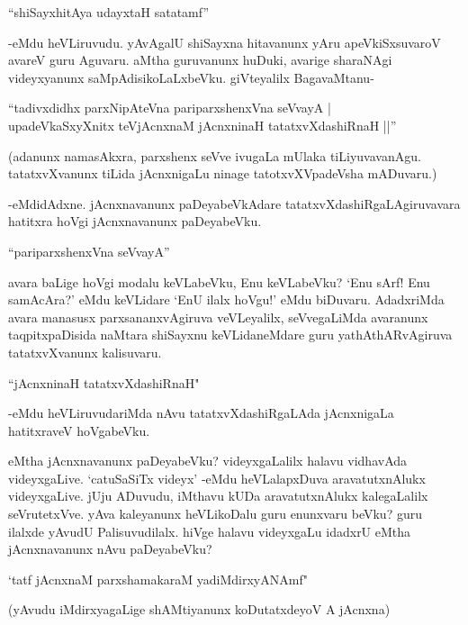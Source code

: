 \begin{shloka} 
``shiSayxhitAya udayxtaH satatamf'' 
\end{shloka}

-eMdu heVLiruvudu. yAvAgalU shiSayxna hitavanunx yAru apeVkiSxsuvaroV avareV guru Aguvaru. aMtha guruvanunx huDuki, avarige sharaNAgi videyxyanunx saMpAdisikoLaLxbeVku. giVteyalilx BagavaMtanu-

\begin{shloka}
``tadivxdidhx parxNipAteVna pariparxshenxVna seVvayA |\\
upadeVkaSxyXnitx teVjAcnxnaM jAcnxninaH tatatxvXdashiRnaH ||''
\end{shloka}

(adanunx namasAkxra, parxshenx seVve ivugaLa mUlaka tiLiyuvavanAgu. tatatxvXvanunx tiLida jAcnxnigaLu ninage tatotxvXVpadeVsha mADuvaru.)

-eMdidAdxne. jAcnxnavanunx paDeyabeVkAdare tatatxvXdashiRgaLAgiruvavara hatitxra hoVgi jAcnxnavanunx paDeyabeVku.

\begin{shloka}
``pariparxshenxVna seVvayA''
\end{shloka}

avara baLige hoVgi modalu keVLabeVku, Enu keVLabeVku? `Enu sArf! Enu samAcAra?' eMdu keVLidare `EnU ilalx hoVgu!' eMdu biDuvaru. AdadxriMda avara manasusx parxsananxvAgiruva veVLeyalilx, seVvegaLiMda avaranunx taqpitxpaDisida naMtara shiSayxnu keVLidaneMdare guru yathAthARvAgiruva tatatxvXvanunx kalisuvaru. 

\begin{shloka}
``jAcnxninaH tatatxvXdashiRnaH"
\end{shloka}

-eMdu heVLiruvudariMda nAvu tatatxvXdashiRgaLAda jAcnxnigaLa hatitxraveV hoVgabeVku.

eMtha jAcnxnavanunx paDeyabeVku? videyxgaLalilx halavu vidhavAda videyxgaLive. `catuSaSiTx videyx' -eMdu heVLalapxDuva aravatutxnAlukx videyxgaLive. jUju ADuvudu, iMthavu kUDa aravatutxnAlukx kalegaLalilx seVrutetxVve. yAva kaleyanunx heVLikoDalu guru enunxvaru beVku? guru ilalxde yAvudU Palisuvudilalx. hiVge halavu videyxgaLu idadxrU eMtha jAcnxnavanunx nAvu paDeyabeVku? 

\begin{shloka}
`tatf jAcnxnaM parxshamakaraM yadiMdirxyANAmf" 
\end{shloka}

(yAvudu iMdirxyagaLige shAMtiyanunx koDutatxdeyoV A jAcnxna)


